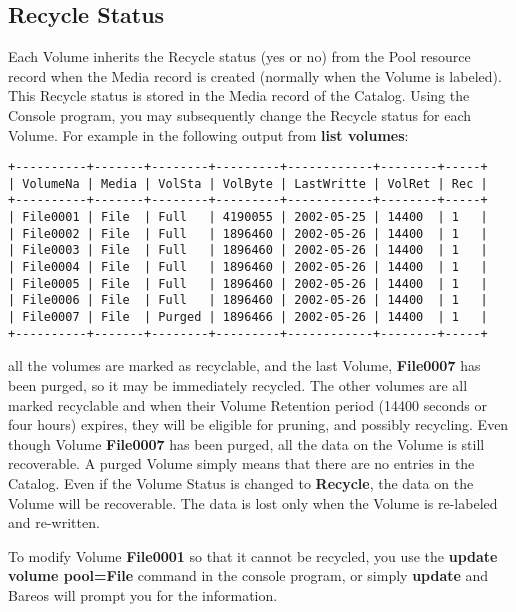 \subsection{Recycle Status}

Each Volume inherits the Recycle status (yes or no) from the Pool resource
record when the Media record is created (normally when the Volume is labeled).
This Recycle status is stored in the Media record of the Catalog. Using
the Console program, you may subsequently change the Recycle status for each
Volume. For example in the following output from {\bf list volumes}:

\footnotesize
\begin{verbatim}
+----------+-------+--------+---------+------------+--------+-----+
| VolumeNa | Media | VolSta | VolByte | LastWritte | VolRet | Rec |
+----------+-------+--------+---------+------------+--------+-----+
| File0001 | File  | Full   | 4190055 | 2002-05-25 | 14400  | 1   |
| File0002 | File  | Full   | 1896460 | 2002-05-26 | 14400  | 1   |
| File0003 | File  | Full   | 1896460 | 2002-05-26 | 14400  | 1   |
| File0004 | File  | Full   | 1896460 | 2002-05-26 | 14400  | 1   |
| File0005 | File  | Full   | 1896460 | 2002-05-26 | 14400  | 1   |
| File0006 | File  | Full   | 1896460 | 2002-05-26 | 14400  | 1   |
| File0007 | File  | Purged | 1896466 | 2002-05-26 | 14400  | 1   |
+----------+-------+--------+---------+------------+--------+-----+
\end{verbatim}
\normalsize

all the volumes are marked as recyclable, and the last Volume, {\bf File0007}
has been purged, so it may be immediately recycled. The other volumes are all
marked recyclable and when their Volume Retention period (14400 seconds or four
hours) expires, they will be eligible for pruning, and possibly recycling.
Even though Volume {\bf File0007} has been purged, all the data on the Volume
is still recoverable. A purged Volume simply means that there are no entries
in the Catalog. Even if the Volume Status is changed to {\bf Recycle}, the
data on the Volume will be recoverable. The data is lost only when the Volume
is re-labeled and re-written.

To modify Volume {\bf File0001} so that it cannot be recycled, you use the
{\bf update volume pool=File} command in the console program, or simply {\bf
update} and Bareos will prompt you for the information.

